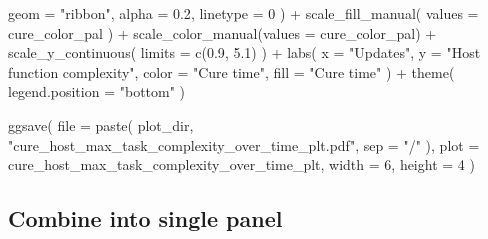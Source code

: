 \documentclass[
]{book}
\newenvironment{Shaded}{\begin{snugshade}}{\end{snugshade}}
\newcommand{\AttributeTok}[1]{\textcolor[rgb]{0.77,0.63,0.00}{#1}}
\newcommand{\DecValTok}[1]{\textcolor[rgb]{0.00,0.00,0.81}{#1}}
\newcommand{\FloatTok}[1]{\textcolor[rgb]{0.00,0.00,0.81}{#1}}
\newcommand{\FunctionTok}[1]{\textcolor[rgb]{0.00,0.00,0.00}{#1}}
\newcommand{\NormalTok}[1]{#1}
\newcommand{\SpecialCharTok}[1]{\textcolor[rgb]{0.00,0.00,0.00}{#1}}
\newcommand{\StringTok}[1]{\textcolor[rgb]{0.31,0.60,0.02}{#1}}
\begin{document}
\begin{Shaded}
\begin{Highlighting}[]
    \AttributeTok{geom =} \StringTok{"ribbon"}\NormalTok{,}
    \AttributeTok{alpha =} \FloatTok{0.2}\NormalTok{,}
    \AttributeTok{linetype =} \DecValTok{0}
\NormalTok{  ) }\SpecialCharTok{+}
  \FunctionTok{scale\_fill\_manual}\NormalTok{(}
    \AttributeTok{values =}\NormalTok{ cure\_color\_pal}
\NormalTok{  ) }\SpecialCharTok{+}
  \FunctionTok{scale\_color\_manual}\NormalTok{(}\AttributeTok{values =}\NormalTok{ cure\_color\_pal) }\SpecialCharTok{+}
  \FunctionTok{scale\_y\_continuous}\NormalTok{(}
    \AttributeTok{limits =} \FunctionTok{c}\NormalTok{(}\FloatTok{0.9}\NormalTok{, }\FloatTok{5.1}\NormalTok{)}
\NormalTok{  ) }\SpecialCharTok{+}
  \FunctionTok{labs}\NormalTok{(}
    \AttributeTok{x =} \StringTok{"Updates"}\NormalTok{,}
    \AttributeTok{y =} \StringTok{"Host function complexity"}\NormalTok{,}
    \AttributeTok{color =} \StringTok{"Cure time"}\NormalTok{,}
    \AttributeTok{fill =} \StringTok{"Cure time"}
\NormalTok{  ) }\SpecialCharTok{+}
  \FunctionTok{theme}\NormalTok{(}
    \AttributeTok{legend.position =} \StringTok{"bottom"}
\NormalTok{  )}

\FunctionTok{ggsave}\NormalTok{(}
  \AttributeTok{file =} \FunctionTok{paste}\NormalTok{(}
\NormalTok{    plot\_dir,}
    \StringTok{"cure\_host\_max\_task\_complexity\_over\_time\_plt.pdf"}\NormalTok{,}
    \AttributeTok{sep =} \StringTok{"/"}
\NormalTok{  ),}
  \AttributeTok{plot =}\NormalTok{ cure\_host\_max\_task\_complexity\_over\_time\_plt,}
  \AttributeTok{width =} \DecValTok{6}\NormalTok{,}
  \AttributeTok{height =} \DecValTok{4}
\NormalTok{)}
\end{Highlighting}
\end{Shaded}

\hypertarget{combine-into-single-panel}{%
\subsection{Combine into single panel}\label{combine-into-single-panel}}
\end{document}
